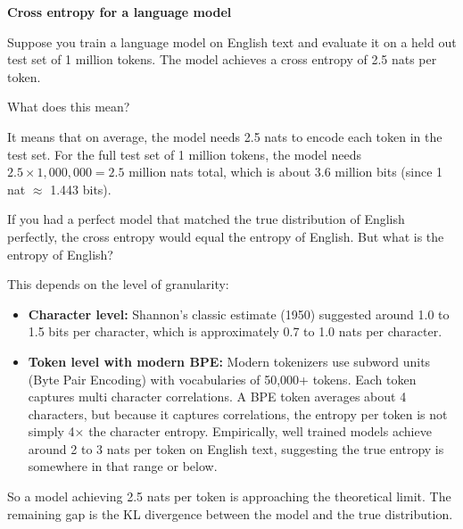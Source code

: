 \begin{examplebox}
\textbf{Cross entropy for a language model}

\vspace{0.5em}

Suppose you train a language model on English text and evaluate it on a held out test set of 1 million tokens. The model achieves a cross entropy of 2.5 nats per token.

\vspace{0.5em}

What does this mean?

\vspace{0.5em}

It means that on average, the model needs 2.5 nats to encode each token in the test set. For the full test set of 1 million tokens, the model needs $2.5 \times 1{,}000{,}000 = 2.5$ million nats total, which is about 3.6 million bits (since 1 nat $\approx$ 1.443 bits).

\vspace{0.5em}

If you had a perfect model that matched the true distribution of English perfectly, the cross entropy would equal the entropy of English. But what is the entropy of English?

\vspace{0.5em}

This depends on the level of granularity:

\begin{itemize}
\item \textbf{Character level:} Shannon's classic estimate (1950) suggested around 1.0 to 1.5 bits per character, which is approximately 0.7 to 1.0 nats per character.

\item \textbf{Token level with modern BPE:} Modern tokenizers use subword units (Byte Pair Encoding) with vocabularies of 50,000+ tokens. Each token captures multi character correlations. A BPE token averages about 4 characters, but because it captures correlations, the entropy per token is not simply 4× the character entropy. Empirically, well trained models achieve around 2 to 3 nats per token on English text, suggesting the true entropy is somewhere in that range or below.
\end{itemize}

\vspace{0.5em}

So a model achieving 2.5 nats per token is approaching the theoretical limit. The remaining gap is the KL divergence between the model and the true distribution.
\end{examplebox}

